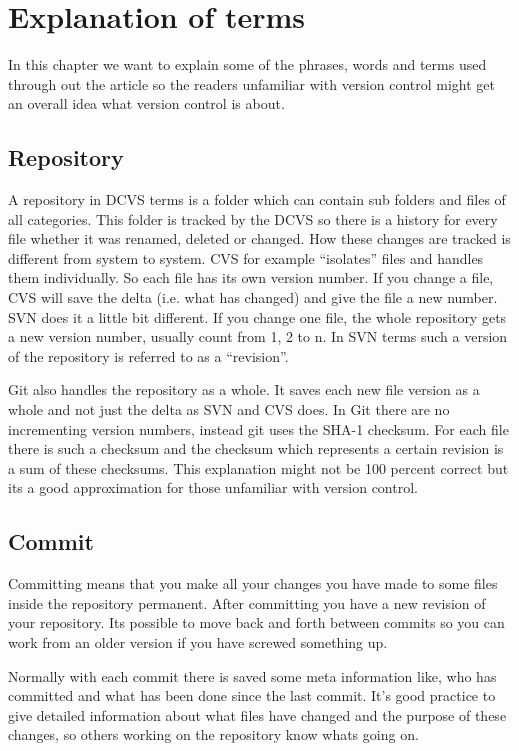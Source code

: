 \section{Explanation of terms}

In this chapter we want to explain some of the phrases, words and terms used through out the article so the 
readers unfamiliar with version control might get an overall idea what version control is about.

\subsection{Repository}

A repository in DCVS terms is a folder which can contain sub folders and files of all categories. 
This folder is tracked by the DCVS so there is a history for every file whether it was renamed, deleted or changed. 
How these changes are tracked is different from system to system. CVS for example “isolates” 
files and handles them individually. So each file has its own version number. If you change a file, CVS will 
save the delta (i.e. what has changed) and give the file a new number. SVN does it a little bit 
different. If you change one file, the whole repository gets a new version number, usually count from 1, 2 to n. 
In SVN terms such a version of the repository is referred to as a “revision”.

Git also handles the repository as a whole. It saves each new file version as a whole and not just the delta as SVN and CVS does. 
In Git there are no incrementing version numbers, instead git uses the SHA-1 checksum. For each file there is such a 
checksum and the checksum which represents a certain revision is a sum of these checksums. 
This explanation might not be 100 percent correct but its a good approximation for those unfamiliar with version control.


\subsection{Commit}

Committing means that you make all your changes you have made to some files inside the repository permanent. 
After committing you have a new revision of your repository. Its possible to move back and forth between commits so you can work 
from an older version if you have screwed something up.

Normally with each commit there is saved some meta information like, who has committed and what has been done since the last commit. 
It's good practice to give detailed information about what files have changed and the purpose of these changes, so others working 
on the repository know whats going on.


